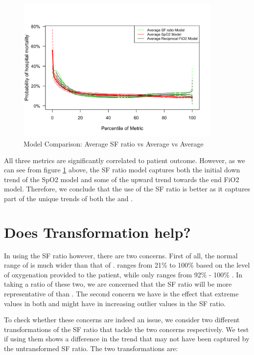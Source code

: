 \begin{figure}[H]
	\centering
	\includegraphics[width=0.9\textwidth]{figures/toratioornottoratio-4.png}
	\caption{Model Comparison: Average SF ratio vs Average \Sp vs Average \Fi}
	\label{fig:toratioornot}
\end{figure}

All three metrics are significantly correlated to patient outcome. However, as we can see from  figure \ref{fig:toratioornot} above, the SF ratio model captures both the initial down trend of the SpO2 model and some of the upward trend towards the end  FiO2 model. Therefore, we conclude that the use of the SF ratio is better as it captures part of the unique trends of both the \Sp and \Fi. 


\section{Does Transformation help?}

In using the SF ratio however, there are two concerns. First of all, the normal range of \Fi is much wider than that of \Sp. \Fi ranges from 21\% to 100\% based on the level of oxygenation provided to the patient, while \Sp only ranges from 92\% - 100\% \citep{lapum2018vital}. In taking a ratio of these two, we are concerned that the SF ratio will be more representative of \Fi than \Sp. The second concern we have is the effect that extreme values in both \Sp and \Fi might have in increasing outlier values in the SF ratio.

To check whether these concerns are indeed an issue, we consider two different transformations of the SF ratio that tackle the two concerns respectively. We test if using them shows a difference in the trend that may not have been captured by the untransformed SF ratio. The two transformations are:

